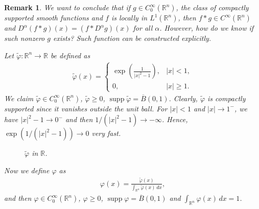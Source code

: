\documentclass[11pt]{book}
\newtheorem{remark}{Remark}[chapter]
\theoremstyle{definition}
\numberwithin{equation}{chapter}
\begin{document}
\begin{remark}
We want to conclude that if $g \in C^\infty_0(\mathbb{R}^n)$, the class of compactly supported smooth functions and $f$ is locally in $L^1(\mathbb{R}^n)$, then $f*g \in C^\infty(\mathbb{R}^n)$ and $D^{\alpha}(f*g)(x) = \left(f*D^{\alpha}g\right)(x)$ for all $\alpha$. However, how do we know if such nonzero $g$ exists? Such function can be constructed explicitly.

Let $\widetilde{\varphi}: \mathbb{R}^n \to \mathbb{R}$ be defined as
\begin{align*}
    \widetilde{\varphi}(x) = \begin{cases}
        \exp\left(\frac{1}{\left|x\right|^2 - 1}\right), & \left|x\right| < 1, \\
        0, & \left|x\right| \geq 1.
    \end{cases}
\end{align*}
We claim $\widetilde{\varphi} \in C^\infty_0(\mathbb{R}^n)$, $\widetilde{\varphi} \geq 0$, $\operatorname{supp} \widetilde{\varphi} = \overline{B}(0,1)$. Clearly, $\widetilde{\varphi}$ is compactly supported since it vanishes outside the unit ball. For $\left|x\right| < 1$ and $\left|x\right| \to 1^-$, we have $\left|x\right|^2 - 1 \to 0^{-}$ and then $1/(\left|x\right|^2 - 1) \to -\infty$. Hence, $\exp(1/(\left|x\right|^2 - 1)) \to 0$ very fast.
\begin{figure}[H]
    \centering
    \caption{$\widetilde{\varphi}$ in $\mathbb{R}$.}
    \label{compactly_support_function_1}
\end{figure}

Now we define $\varphi$ as
\begin{align*}
    \varphi(x) = \frac{\widetilde{\varphi}(x)}{\int_{\mathbb{R}^n}\widetilde{\varphi}(x)\,dx},
\end{align*}
and then $\varphi \in C^\infty_0(\mathbb{R}^n)$, $\varphi \geq 0$, $\operatorname{supp} \varphi = \overline{B}(0,1)$ and $\int_{\mathbb{R}^n}\varphi(x)\,dx = 1$.


\end{remark}
\end{document}
